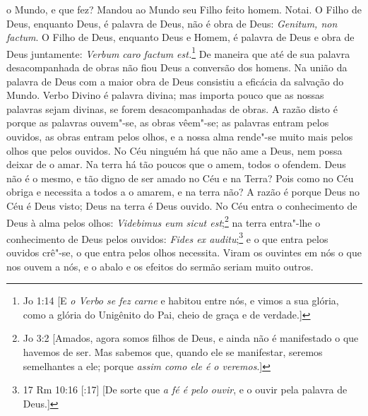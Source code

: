 o Mundo, e que fez? Mandou ao Mundo seu Filho feito homem. Notai. O
Filho de Deus, enquanto Deus, é palavra de Deus, não é obra de Deus:
\emph{Genitum, non factum}. O Filho de Deus, enquanto Deus e Homem, é
palavra de Deus e obra de Deus juntamente: \emph{Verbum caro factum
est.}\footnote{Jo 1:14 [E \textit{o Verbo se fez carne} e habitou entre nós, e vimos a sua glória, como a glória do Unigênito do Pai, cheio de graça e de verdade.]} De maneira que até de sua palavra desacompanhada de obras não fiou
Deus a conversão dos homens. Na união da palavra de Deus com a maior
obra de Deus consistiu a eficácia da salvação do Mundo. Verbo Divino é
palavra divina; mas importa pouco que as nossas palavras sejam divinas,
se forem desacompanhadas de obras. A razão disto é porque as palavras
ouvem"-se, as obras vêem"-se; as palavras entram pelos ouvidos, as obras
entram pelos olhos, e a nossa alma rende"-se muito mais pelos olhos que
pelos ouvidos. No Céu ninguém há que não ame a Deus, nem possa deixar de
o amar. Na terra há tão poucos que o amem, todos o ofendem. Deus não é o
mesmo, e tão digno de ser amado no Céu e na Terra? Pois como no Céu
obriga e necessita a todos a o amarem, e na terra não? A razão é porque
Deus no Céu é Deus visto; Deus na terra é Deus ouvido. No Céu entra o
conhecimento de Deus à alma pelos olhos: \emph{Videbimus eum sicut est};\footnote{Jo 3:2 [Amados, agora somos filhos de Deus, e ainda não é manifestado o que havemos de ser. Mas
sabemos que, quando ele se manifestar, seremos semelhantes a ele; porque \textit{assim como ele é o veremos}.]}
na terra entra"-lhe o conhecimento de Deus pelos ouvidos: \emph{Fides ex
auditu};\footnote{17 Rm 10:16 [:17] [De sorte que \textit{a fé é pelo ouvir}, e o ouvir pela palavra de Deus.]} e o que entra pelos ouvidos crê"-se, o que entra pelos olhos
necessita. Viram os ouvintes em nós o que nos ouvem a nós, e o abalo e
os efeitos do sermão seriam muito outros.

